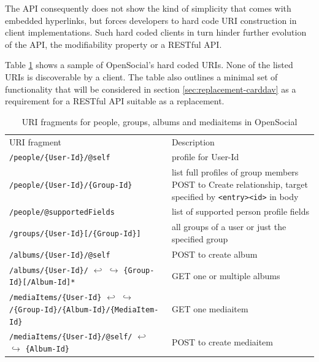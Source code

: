 \documentclass[11pt,a4paper,headsepline,twoside]{scrartcl}		%
\begin{document}
The API consequently does not show the kind of simplicity that comes with
embedded hyperlinks, but forces developers to hard code URI construction in
client implementations. Such hard coded clients in turn hinder further evolution
of the API, the modifiability property or a RESTful API\cite[sec
2.3]{Fielding2000}.

Table \ref{tab:OSURIs} shows a sample of OpenSocial's hard coded URIs. None
of the listed URIs is discoverable by a client. The table also outlines a minimal
set of functionality that will be considered in section
\ref{sec:replacement-carddav} as a requirement for a RESTful API suitable as a
replacement.

\begin{table}[tbh]
\begin{tabular}{p{7cm} p{12cm}}
  URI fragment & Description \\
  \verb:/people/{User-Id}/@self: & profile for User-Id \\
  \verb:/people/{User-Id}/{Group-Id}: & list full profiles of group members \newline
                              POST to Create relationship, target \newline
                              specified by \verb:<entry><id>: in body \\
  \verb:/people/@supportedFields: & list of supported person profile fields \\
  \verb:/groups/{User-Id}[/{Group-Id}]: & all groups of a user or just the specified group \\
  \verb:/albums/{User-Id}/@self: & POST to create album \\
  \verb:/albums/{User-Id}/: $\hookleftarrow$ \newline $\hookrightarrow$
  \verb:{Group-Id}[/Album-Id]*: & GET one or multiple albums \\
  \verb:/mediaItems/{User-Id}: $\hookleftarrow$ \newline $\hookrightarrow$ 
  \verb:/{Group-Id}/{Album-Id}/{MediaItem-Id}: & GET one mediaitem \\
  \verb:/mediaItems/{User-Id}/@self/: $\hookleftarrow$ \newline $\hookrightarrow$
  \verb:{Album-Id}:  & POST to create mediaitem \\
\end{tabular}
  \caption{URI fragments for people, groups, albums and mediaitems in OpenSocial}
  \label{tab:OSURIs}
\end{table}
\end{document}
